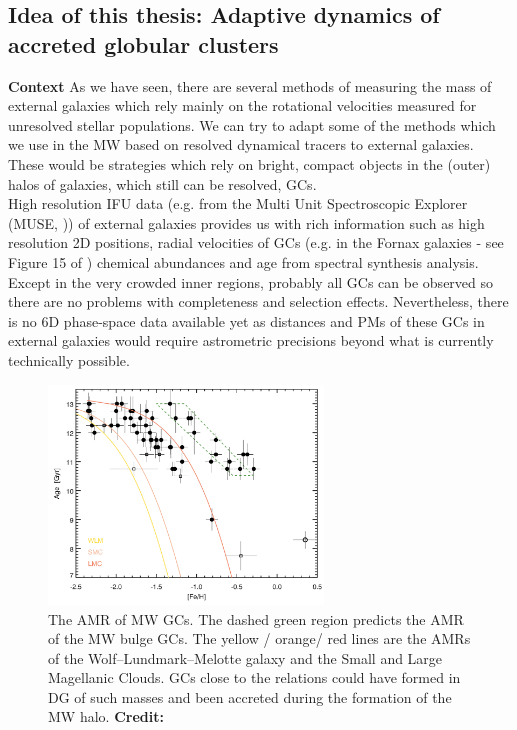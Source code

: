 \subsection{Idea of this thesis: Adaptive dynamics of accreted globular clusters}
\textbf{Context}
As we have seen, there are several methods of measuring the mass of external galaxies which rely mainly on the rotational velocities measured for unresolved stellar populations. We can try to adapt some of the methods which we use in the \ac{MW} based on resolved dynamical tracers to external galaxies. These would be strategies which rely on bright, compact objects in the (outer) halos of galaxies, which still can be resolved, \acp{GC}. 
\\
High resolution \ac{IFU} data (e.g. from the Multi Unit Spectroscopic Explorer (MUSE, \citealp{Bacon...MUSE...2010})) of external galaxies provides us with rich information such as high resolution 2D positions, radial velocities of \acp{GC} (e.g. in the Fornax galaxies - see Figure 15 of \citealp{Sarzi...Fornax3d....2018}) chemical abundances and age from spectral synthesis analysis. Except in the very crowded inner regions, probably all \acp{GC} can be observed so there are no problems with completeness and selection effects. Nevertheless, there is no 6D phase-space data available yet as distances and \acp{PM} of these \acp{GC} in external galaxies would require astrometric precisions beyond what is currently technically possible. 
\begin{figure}
    \captionsetup{format=plain}
    \centering
    \caption{The \ac{AMR} of \ac{MW} \acp{GC}. The dashed green region predicts the \ac{AMR} of the \ac{MW} bulge \acp{GC}. The yellow / orange/ red lines are the \acp{AMR} of the Wolf–Lundmark–Melotte galaxy and the Small and Large Magellanic Clouds. \acp{GC} close to the relations could have formed in \ac{DG} of such masses and been accreted during the formation of the \ac{MW} halo. \textbf{Credit:} \citet{Leaman...agemetall.MWGCs...2013}}
    \label{fig:GC_metal_distinguish}
    \includegraphics[width=0.65\textwidth]{plots/Intro/Leaman_GCmetal.png}
    
\end{figure}
